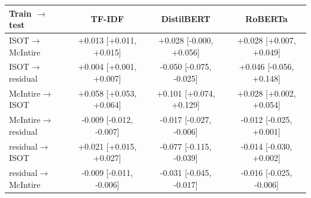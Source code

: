 \begin{tabular}{@{}lccc@{}}
\toprule
Train $\rightarrow$ test & TF-IDF & DistilBERT & RoBERTa\\
\midrule
ISOT$\rightarrow$McIntire & +0.013 [+0.011, +0.015] & +0.028 [-0.000, +0.056] & +0.028 [+0.007, +0.049]\\
ISOT$\rightarrow$residual & +0.004 [+0.001, +0.007] & -0.050 [-0.075, -0.025] & +0.046 [-0.056, +0.148]\\
McIntire$\rightarrow$ISOT & +0.058 [+0.053, +0.064] & +0.101 [+0.074, +0.129] & +0.028 [+0.002, +0.054]\\
McIntire$\rightarrow$residual & -0.009 [-0.012, -0.007] & -0.017 [-0.027, -0.006] & -0.012 [-0.025, +0.001]\\
residual$\rightarrow$ISOT & +0.021 [+0.015, +0.027] & -0.077 [-0.115, -0.039] & -0.014 [-0.030, +0.002]\\
residual$\rightarrow$McIntire & -0.009 [-0.011, -0.006] & -0.031 [-0.045, -0.017] & -0.016 [-0.025, -0.006]\\
\bottomrule
\end{tabular}
